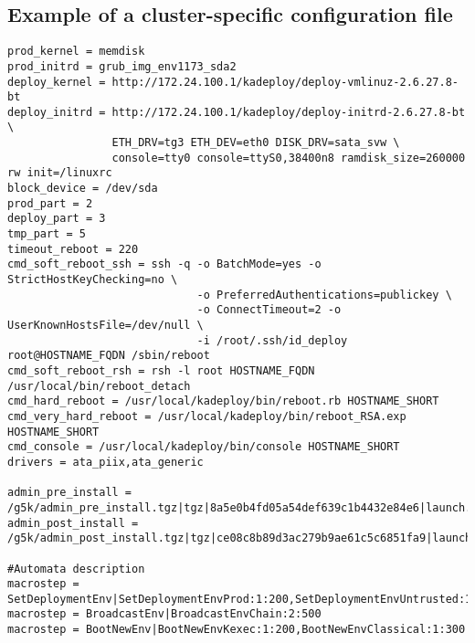 \documentclass[a4wide,10pt,oneside]{book}
\begin{document}
\subsection{Example of a cluster-specific configuration file}
\begin{small}
\begin{verbatim}
prod_kernel = memdisk
prod_initrd = grub_img_env1173_sda2
deploy_kernel = http://172.24.100.1/kadeploy/deploy-vmlinuz-2.6.27.8-bt
deploy_initrd = http://172.24.100.1/kadeploy/deploy-initrd-2.6.27.8-bt \
                ETH_DRV=tg3 ETH_DEV=eth0 DISK_DRV=sata_svw \
                console=tty0 console=ttyS0,38400n8 ramdisk_size=260000 rw init=/linuxrc
block_device = /dev/sda
prod_part = 2
deploy_part = 3
tmp_part = 5
timeout_reboot = 220
cmd_soft_reboot_ssh = ssh -q -o BatchMode=yes -o StrictHostKeyChecking=no \
                             -o PreferredAuthentications=publickey \
                             -o ConnectTimeout=2 -o UserKnownHostsFile=/dev/null \
                             -i /root/.ssh/id_deploy root@HOSTNAME_FQDN /sbin/reboot
cmd_soft_reboot_rsh = rsh -l root HOSTNAME_FQDN /usr/local/bin/reboot_detach
cmd_hard_reboot = /usr/local/kadeploy/bin/reboot.rb HOSTNAME_SHORT
cmd_very_hard_reboot = /usr/local/kadeploy/bin/reboot_RSA.exp HOSTNAME_SHORT
cmd_console = /usr/local/kadeploy/bin/console HOSTNAME_SHORT
drivers = ata_piix,ata_generic

admin_pre_install = /g5k/admin_pre_install.tgz|tgz|8a5e0b4fd05a54def639c1b4432e84e6|launch.sh
admin_post_install = /g5k/admin_post_install.tgz|tgz|ce08c8b89d3ac279b9ae61c5c6851fa9|launch.sh

#Automata description
macrostep = SetDeploymentEnv|SetDeploymentEnvProd:1:200,SetDeploymentEnvUntrusted:1:400
macrostep = BroadcastEnv|BroadcastEnvChain:2:500
macrostep = BootNewEnv|BootNewEnvKexec:1:200,BootNewEnvClassical:1:300
\end{verbatim}
\end{small}
\end{document}

